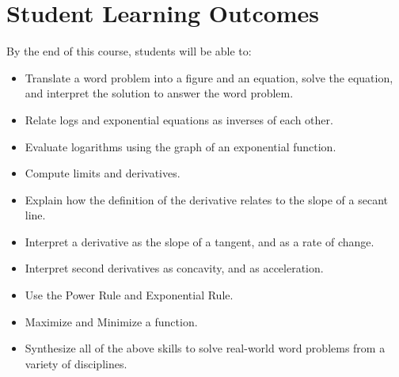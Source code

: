 \documentclass[11pt,letterpaper]{article}
\begin{document}
\section*{Student Learning Outcomes}
By the end of this course, students will be able to:
\begin{itemize}[nosep, label={--}]
\item Translate a word problem into a figure and an equation, solve the equation, and interpret the solution to answer the word problem.
\item Relate logs and exponential equations as inverses of each other.
\item Evaluate logarithms using the graph of an exponential function.
\item Compute limits and derivatives.
\item Explain how the definition of the derivative relates to the slope of a secant line.
\item Interpret a derivative as the slope of a tangent, and as a rate of change.
\item Interpret second derivatives as concavity, and as acceleration.
\item Use the Power Rule and Exponential Rule.
\item Maximize and Minimize a function.
\item Synthesize all of the above skills to solve real-world word problems from a variety of disciplines.
\end{itemize}
\end{document}
